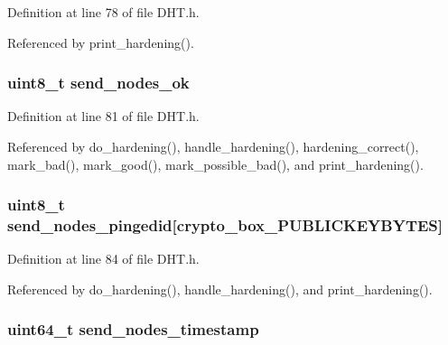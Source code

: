 Definition at line 78 of file D\+H\+T.\+h.



Referenced by print\+\_\+hardening().

\hypertarget{struct_hardening_a11158e002f3685f4044a759680636c08}{
\subsubsection[{send\+\_\+nodes\+\_\+ok}]{\setlength{\rightskip}{0pt plus 5cm}uint8\+\_\+t send\+\_\+nodes\+\_\+ok}}\label{struct_hardening_a11158e002f3685f4044a759680636c08}


Definition at line 81 of file D\+H\+T.\+h.



Referenced by do\+\_\+hardening(), handle\+\_\+hardening(), hardening\+\_\+correct(), mark\+\_\+bad(), mark\+\_\+good(), mark\+\_\+possible\+\_\+bad(), and print\+\_\+hardening().

\hypertarget{struct_hardening_a2c2bfa7e3ff42e353bc44a2183ebc4df}{
\subsubsection[{send\+\_\+nodes\+\_\+pingedid}]{\setlength{\rightskip}{0pt plus 5cm}uint8\+\_\+t send\+\_\+nodes\+\_\+pingedid\mbox{[}crypto\+\_\+box\+\_\+\+P\+U\+B\+L\+I\+C\+K\+E\+Y\+B\+Y\+T\+E\+S\mbox{]}}}\label{struct_hardening_a2c2bfa7e3ff42e353bc44a2183ebc4df}


Definition at line 84 of file D\+H\+T.\+h.



Referenced by do\+\_\+hardening(), handle\+\_\+hardening(), and print\+\_\+hardening().

\hypertarget{struct_hardening_ab15e3d8f0b33943a6978fac3cde4d1a2}{
\subsubsection[{send\+\_\+nodes\+\_\+timestamp}]{\setlength{\rightskip}{0pt plus 5cm}uint64\+\_\+t send\+\_\+nodes\+\_\+timestamp}}\label{struct_hardening_ab15e3d8f0b33943a6978fac3cde4d1a2}


